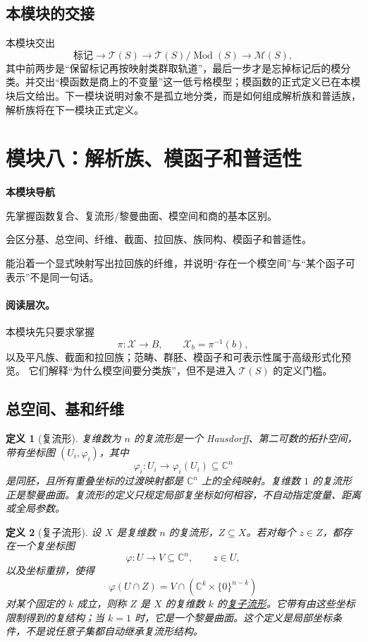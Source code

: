 \documentclass[UTF8,fontset=none,a4paper,11pt]{ctexart}
\theoremstyle{foundation-definition}
\newtheorem{definition}{定义}[section]
\theoremstyle{foundation-theorem}
\theoremstyle{foundation-proposition}
\theoremstyle{foundation-example}
\theoremstyle{foundation-remark}
\theoremstyle{foundation-theorem}
\newcommand{\C}{\mathbb C}
\newcommand{\T}{\mathcal T}
\newcommand{\M}{\mathcal M}
\newcommand{\Mod}{\operatorname{Mod}}
\newcommand{\term}[2]{\hyperref[#1]{#2}}
\newcommand{\moduleguide}[3]{%
\begin{mdframed}[backgroundcolor=definitionbg,linecolor=mainblue,linewidth=1.5pt,
  leftline=true,rightline=false,topline=false,bottomline=false,
  skipabove=9pt,skipbelow=10pt,innerleftmargin=10pt,innerrightmargin=8pt,
  innertopmargin=7pt,innerbottommargin=7pt]
{\sffamily\bfseries\color{mainblue}本模块导航}\par\smallskip
\begin{description}[style=nextline,leftmargin=2.8cm]
  \item[进入前] #1
  \item[本模块产出] #2
  \item[出口检查] #3
\end{description}
\end{mdframed}}
\begin{document}
\subsection{本模块的交接}

本模块交出
\[
\text{标记}\longrightarrow\T(S)
\longrightarrow\T(S)/\Mod(S)
\longrightarrow\M(S),
\]
其中前两步是“保留标记再按映射类群取轨道”，最后一步才是忘掉标记后的模分类。并交出“模函数是商上的不变量”这一低亏格模型；模函数的正式定义已在本模块后文给出。下一模块说明对象不是孤立地分类，而是如何组成解析族和普适族，解析族将在下一模块正式定义。

\clearpage
\section{模块八：解析族、模函子和普适性}

\moduleguide{先掌握函数复合、复流形/黎曼曲面、模空间和商的基本区别。}{会区分基、总空间、纤维、截面、拉回族、族同构、模函子和普适性。}{能沿着一个显式映射写出拉回族的纤维，并说明“存在一个模空间”与“某个函子可表示”不是同一句话。}

\paragraph{阅读层次。}
本模块先只要求掌握
\[
\pi:\mathcal X\to B,\qquad \mathcal X_b=\pi^{-1}(b),
\]
以及平凡族、截面和拉回族；范畴、群胚、模函子和可表示性属于高级形式化预览。
它们解释“为什么模空间要分类族”，但不是进入 \(\T(S)\) 的定义门槛。

\subsection{总空间、基和纤维}

\begin{definition}[复流形]\label{def:complex-manifold}
复维数为 \(n\) 的复流形是一个 Hausdorff、第二可数的拓扑空间，带有坐标图
\((U_i,\varphi_i)\)，其中
\[
\varphi_i:U_i\longrightarrow\varphi_i(U_i)\subseteq\C^n
\]
是同胚，且所有重叠坐标的过渡映射都是 \(\C^n\) 上的全纯映射。复维数 \(1\) 的复流形
正是黎曼曲面。复流形的定义只规定局部复坐标如何相容，不自动指定度量、距离或全局参数。
\end{definition}

\begin{definition}[复子流形]\label{def:complex-submanifold}
设 \(X\) 是复维数 \(n\) 的复流形，\(Z\subseteq X\)。若对每个 \(z\in Z\)，都存在一个复坐标图
\[
 \varphi:U\longrightarrow V\subseteq\C^n,
 \qquad z\in U,
\]
以及坐标重排，使得
\[
 \varphi(U\cap Z)=V\cap(\C^k\times\{0\}^{n-k})
\]
对某个固定的 \(k\) 成立，则称 \(Z\) 是 \(X\) 的复维数 \(k\) 的\term{def:complex-submanifold}{复子流形}。它带有由这些坐标限制得到的复结构；当 \(k=1\) 时，它是一个黎曼曲面。这个定义是局部坐标条件，不是说任意子集都自动继承复流形结构。
\end{definition}
\end{document}
